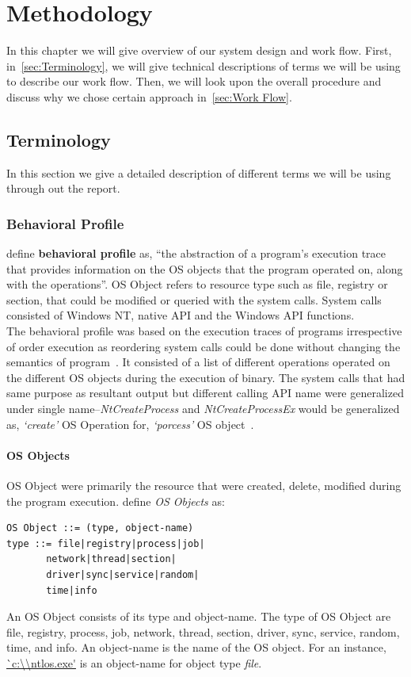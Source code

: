 \chapter{Methodology}\label{chapter:methodology}
In this chapter we will give overview of our system design and work flow.
First, in~\autoref{sec:Terminology}, we will give technical descriptions of terms we will be using to describe our work flow.
Then, we will look upon the overall procedure and discuss why we chose certain approach in~\autoref{sec:Work Flow}.
\section{Terminology}
\label{sec:Terminology}
In this section we give a detailed description of different terms we will be using through out the report.
\subsection{Behavioral Profile}
\label{sub:Behavioral Profile}
\citeauthor{bayer} define \textbf{behavioral profile} as, ``the abstraction of a program's execution trace that provides information on the OS objects that the program operated on, along with the operations''.
OS Object refers to resource type such as file, registry or section, that could be modified or queried with the system calls.
System calls consisted of Windows NT, native API and the Windows API functions.\\
The behavioral profile was based on the execution traces of programs irrespective of order execution as reordering system calls could be done without changing the semantics of program~\cite[]{bayer}.
It consisted of a list of different operations operated on the different OS objects during the execution of binary.
The system calls that had same purpose as resultant output but different calling API name were generalized under single name--\emph{NtCreateProcess} and \emph{NtCreateProcessEx} would be generalized as, \emph{`create'} OS Operation for, \emph{`porcess'} OS object~\cite[]{bayer}.\\
\subsubsection{OS Objects}
\label{ssub:OS Objects}
OS Object were primarily the resource that were created, delete, modified during the program execution.
\citeauthor{bayer} define \emph{OS Objects} as:
\begin{lstlisting}
OS Object ::= (type, object-name)
type ::= file|registry|process|job|
       network|thread|section|
       driver|sync|service|random|
       time|info
\end{lstlisting}
An OS Object consists of its type and object-name.
The type of OS Object are file, registry, process, job, network, thread, section, driver, sync, service, random, time, and info.
An object-name is the name of the OS object.
For an instance, \url{`c:\\ntlos.exe'} is an object-name for object type \emph{file}.


